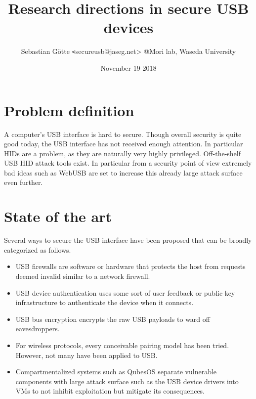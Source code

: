 \documentclass[12pt,a4paper,notitlepage]{article}
\author{Sebastian Götte {\texttt<secureusb@jaseg.net>} @Mori lab, Waseda University}
\title{Research directions in secure USB devices}
\date{November 19 2018}
\begin{document}
\maketitle

\section{Problem definition}
A computer's USB interface is hard to secure. Though overall security is quite good today, the USB interface has not
received enough attention. In particular HIDs are a problem, as they are naturally very highly privileged.
Off-the-shelf USB HID attack tools exist. In particular from a security point of view extremely bad ideas such as
WebUSB\cite{misc01} are set to increase this already large attack surface even further.

\section{State of the art}
Several ways to secure the USB interface have been proposed that can be broadly categorized as follows.
\begin{itemize}
    \item USB firewalls are software or hardware that protects the host from requests deemed invalid similar to a network firewall\cite{tian01,angel01,kang01,bates01,loe01}.
    \item USB device authentication uses some sort of user feedback or public key infrastructure to authenticate the device when it connects\cite{usb01,griscioli01,wang01,he01}.
    \item USB bus encryption encrypts the raw USB payloads to ward off eavesdroppers\cite{neugschwandtner01,weinstein01}.
    \item For wireless protocols, every conceivable pairing model has been tried. However, not many have been applied to
        USB\cite{arun01,uzun01,kobsa01,saxena01}.
    \item Compartmentalized systems such as QubesOS separate vulnerable components with large attack surface such as the USB device drivers into VMs to not inhibit exploitation but mitigate its consequences.
\end{itemize}
\end{document}
